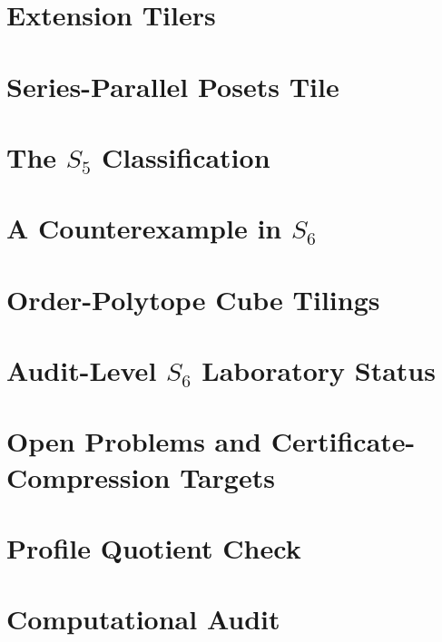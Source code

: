 \documentclass[11pt,a4paper]{article}
\theoremstyle{definition}
\begin{document}
\section{Extension Tilers}


\section{Series-Parallel Posets Tile}


\section{The \texorpdfstring{$S_5$}{S5} Classification}


\section{A Counterexample in \texorpdfstring{$S_6$}{S6}}


\section{Order-Polytope Cube Tilings}
\label{sec:order-polytope-cube-tilings}


\section{Audit-Level \texorpdfstring{$S_6$}{S6} Laboratory Status}


\section{Open Problems and Certificate-Compression Targets}


\appendix
\section{Profile Quotient Check}
\label{app:profile-quotient}


\section{Computational Audit}
\label{app:computational-audit}

\end{document}
